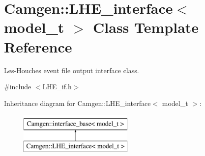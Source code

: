 \hypertarget{a00327}{}\section{Camgen\+:\+:L\+H\+E\+\_\+interface$<$ model\+\_\+t $>$ Class Template Reference}
\label{a00327}


Les-\/\+Houches event file output interface class.  




{\ttfamily \#include $<$L\+H\+E\+\_\+if.\+h$>$}

Inheritance diagram for Camgen\+:\+:L\+H\+E\+\_\+interface$<$ model\+\_\+t $>$\+:\begin{figure}[H]
\begin{center}
\leavevmode
\includegraphics[height=2.000000cm]{a00327}
\end{center}
\end{figure}
